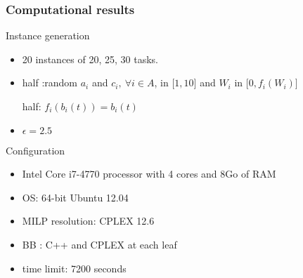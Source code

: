   \begin{frame}
    \frametitle{Computational results}
    \vfill
    \begin{block}{Instance generation}
      \begin{itemize}
      \item 20 instances of 20, 25, 30 tasks. 
      \item half :random  $a_i$ and $c_i,\ \forall i \in A$, in ${[}1,10{]}$
        and $W_i$ in ${[}0,f_i(W_i){]}$

        half: $f_i(b_i(t))= b_i(t)$
      \item $\epsilon = 2.5$ 
      \end{itemize}
    \end{block}
    \vfill
    \pause
    \begin{block}{Configuration}
      \begin{itemize}
      \item Intel Core i7-4770 processor with 4 cores and 8Go of RAM
      \item OS: 64-bit Ubuntu 12.04
      \item MILP resolution: CPLEX 12.6  
      \item BB : C++ and CPLEX at each leaf
      \item time limit: 7200 seconds
      \end{itemize}
    \end{block}
    \vfill
  \end{frame}
\mydat
